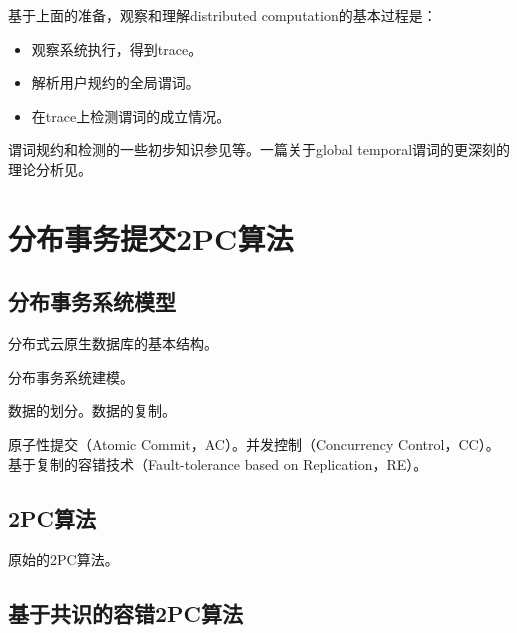 \documentclass[UTF8]{ctexrep}
\begin{document}
基于上面的准备，观察和理解distributed computation的基本过程是：

\begin{itemize}
    \item 观察系统执行，得到trace。
    \item 解析用户规约的全局谓词。
    \item 在trace上检测谓词的成立情况。
\end{itemize}

谓词规约和检测的一些初步知识参见\cite{Chandy85, Cooper91, Babaoglu95}等。一篇关于global temporal谓词的更深刻的理论分析见\cite{Charron95}。



\chapter{分布事务提交2PC算法} \label{Chap_2PC}

\section{分布事务系统模型}

分布式云原生数据库的基本结构。

分布事务系统建模。

数据的划分。数据的复制。

原子性提交（Atomic Commit，AC）。并发控制（Concurrency Control，CC）。基于复制的容错技术（Fault-tolerance based on Replication，RE）。


\section{2PC算法}

原始的2PC算法。

\section{基于共识的容错2PC算法}
\end{document}
